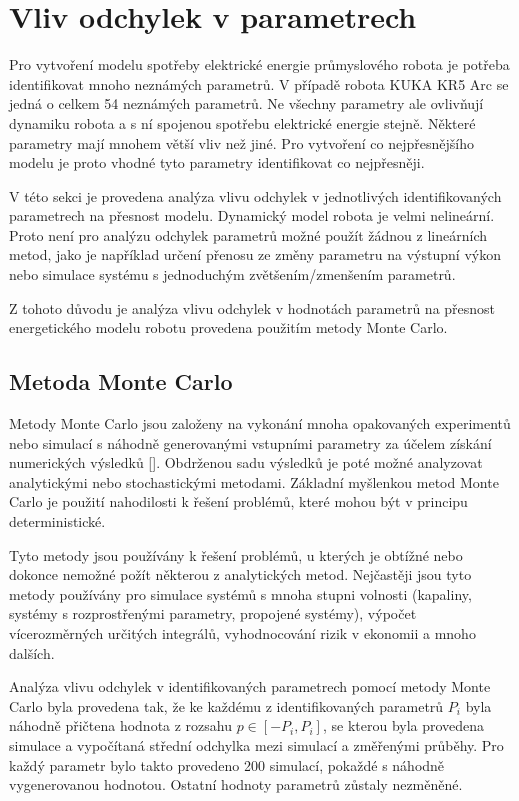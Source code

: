\chapter{Vliv odchylek v parametrech}

Pro vytvoření modelu spotřeby elektrické energie průmyslového robota je potřeba identifikovat mnoho neznámých parametrů. V případě robota KUKA KR5 Arc se jedná o celkem 54 neznámých parametrů. Ne všechny parametry ale ovlivňují dynamiku robota a s ní spojenou spotřebu elektrické energie stejně. Některé parametry mají mnohem větší vliv než jiné. Pro vytvoření co nejpřesnějšího modelu je proto vhodné tyto parametry identifikovat co nejpřesněji. 

V této sekci je provedena analýza vlivu odchylek v jednotlivých identifikovaných parametrech na přesnost modelu. Dynamický model robota je velmi nelineární. Proto není pro analýzu odchylek parametrů možné použít žádnou z lineárních metod, jako je například určení přenosu ze změny parametru na výstupní výkon nebo simulace systému s jednoduchým zvětšením/zmenšením parametrů. 

Z tohoto důvodu je analýza vlivu odchylek v hodnotách parametrů na přesnost energetického modelu robotu provedena použitím metody Monte Carlo. 

\section{Metoda Monte Carlo}

Metody Monte Carlo jsou založeny na vykonání mnoha opakovaných experimentů nebo simulací s náhodně generovanými vstupními parametry za účelem získání numerických výsledků [\cite{monte_carlo_ref}]. Obdrženou sadu výsledků je poté možné analyzovat analytickými nebo stochastickými metodami. Základní myšlenkou metod Monte Carlo je použití nahodilosti k řešení problémů, které mohou být v principu deterministické.

Tyto metody jsou používány k řešení problémů, u kterých je obtížné nebo dokonce nemožné požít některou z analytických metod. Nejčastěji jsou tyto metody používány pro simulace systémů s mnoha stupni volnosti (kapaliny, systémy s rozprostřenými parametry, propojené systémy), výpočet vícerozměrných určitých integrálů, vyhodnocování rizik v ekonomii a mnoho dalších. 

Analýza vlivu odchylek v identifikovaných parametrech pomocí metody Monte Carlo byla provedena tak, že ke každému z identifikovaných parametrů $P_i$ byla náhodně přičtena hodnota z rozsahu $p \in [-P_i,P_i]$, se kterou byla provedena simulace a vypočítaná střední odchylka mezi simulací a změřenými průběhy. Pro každý parametr bylo takto provedeno 200 simulací, pokaždé s náhodně vygenerovanou hodnotou. Ostatní hodnoty parametrů zůstaly nezměněné. 

